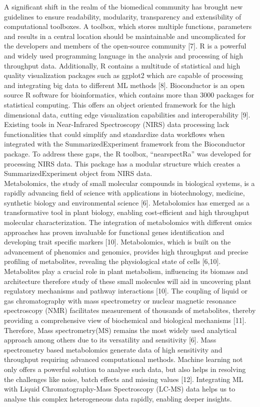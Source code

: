 \documentclass[12pt,a4paper]{article}
\begin{document}
A significant  shift in the realm of the biomedical community has brought new guidelines to ensure readability, modularity, transparency and extensibility of computational toolboxes. A toolbox, which stores multiple functions, parameters and results in a central location should be maintainable and uncomplicated for the developers and members of the open-source community [7].
R is a powerful and widely used programming language in the analysis and processing of high throughput data. Additionally, R contains a multitude of statistical and high quality visualization packages such as ggplot2 which are capable of processing and integrating big data to different ML methods [8]. Bioconductor is an open source R software for bioinformatics, which contains more than 3000 packages for statistical computing. 
This offers an object oriented framework for the high dimensional data, cutting edge visualization capabilities and interoperability [9]. Existing tools in Near-Infrared Spectroscopy (NIRS) data processing lack functionalities that could simplify and standardize data workflows when integrated with the SummarizedExperiment framework from the Bioconductor package. To address these gaps, the R toolbox, “nearspectRa” was developed for processing NIRS data.
This package has a modular structure which creates a SummarizedExperiment object from NIRS data. \\


Metabolomics, the study of small molecular compounds in biological systems, is a rapidly advancing field of science with applications in biotechnology, medicine, synthetic biology and environmental science [6]. Metabolomics has emerged as a transformative tool in plant biology, enabling cost-efficient and high throughput molecular characterization.
The integration of metabolomics with different omics approaches has proven invaluable for functional genes identification and developing trait specific markers [10]. Metabolomics, which is built on the advancement of phenomics and genomics, provides high throughput and precise profiling of metabolites, revealing the physiological state of cells [6,10].
Metabolites play a crucial role in plant metabolism, influencing its biomass and architecture therefore study of these small molecules will aid in uncovering plant regulatory mechanisms and pathway interactions [10].
The coupling of liquid or gas chromatography with mass spectrometry or nuclear magnetic resonance spectroscopy (NMR) facilitates measurement of thousands of metabolites, thereby providing a comprehensive view of biochemical and biological mechanisms [11]. Therefore, Mass spectrometry(MS) remains the most widely used analytical approach among others due to its versatility and sensitivity [6].
Mass spectrometry based metabolomics generate data of high sensitivity and throughput requiring advanced computational methods. Machine learning not only offers a powerful solution to analyse such data, but also helps in resolving the challenges like noise, batch effects and missing values [12]. Integrating ML with Liquid Chromatography-Mass Spectroscopy (LC-MS) data helps us to analyse this complex heterogeneous data rapidly, enabling deeper insights. \\
\end{document}
